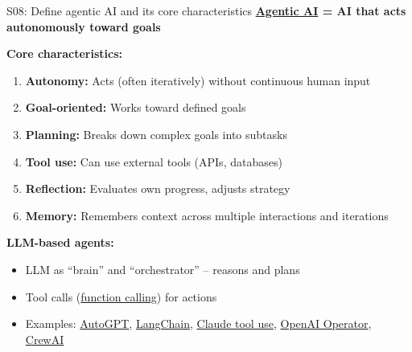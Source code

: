 \documentclass[aspectratio=169, 10pt]{beamer}
\begin{document}
\begin{frame}{S08: Define agentic AI and its core characteristics}
    \textbf{\href{https://en.wikipedia.org/wiki/Agentic_AI}{Agentic AI} = AI that acts autonomously toward goals}
    
    \vspace{0.2cm}
    \textbf{Core characteristics:}
    \begin{enumerate}
        \item \textbf{Autonomy:} Acts (often iteratively) without continuous human input
        \item \textbf{Goal-oriented:} Works toward defined goals
        \item \textbf{Planning:} Breaks down complex goals into subtasks
        \item \textbf{Tool use:} Can use external tools (APIs, databases)
        \item \textbf{Reflection:} Evaluates own progress, adjusts strategy
        \item \textbf{Memory:} Remembers context across multiple interactions and iterations
    \end{enumerate}
    
    \vspace{0.2cm}
    \textbf{LLM-based agents:}
    \begin{itemize}
        \item LLM as ``brain'' and ``orchestrator'' -- reasons and plans
        \item Tool calls (\href{https://platform.openai.com/docs/guides/function-calling}{function calling}) for actions
        \item Examples: \href{https://github.com/Significant-Gravitas/AutoGPT}{AutoGPT}, \href{https://www.langchain.com/}{LangChain}, \href{https://docs.anthropic.com/claude/docs/tool-use}{Claude tool use}, \href{https://openai.com/index/introducing-operator/}{OpenAI Operator}, \href{https://www.crewai.com/}{CrewAI}
    \end{itemize}
\end{frame}
\end{document}
